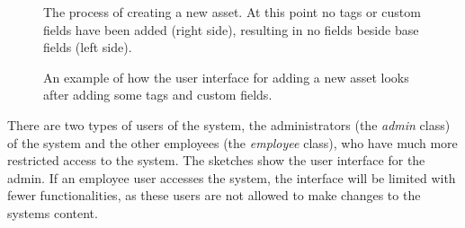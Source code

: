 \begin{figure}[H]
    \centering
    \caption{The process of creating a new asset. At this point no tags or custom fields have been added (right side), resulting in no fields beside base fields (left side).}
    \label{fig:add_asset_no_tags}
\end{figure}

\begin{figure}[H]
    \centering
    \caption{An example of how the user interface for adding a new asset looks after adding some tags and custom fields.}
    \label{fig:add_asset_with_tags}
\end{figure}

There are two types of users of the system, the administrators (the \textit{admin} class) of the system and the other employees (the \textit{employee} class), who have much more restricted access to the system. The sketches show the user interface for the admin. If an employee user accesses the system, the interface will be limited with fewer functionalities, as these users are not allowed to make changes to the systems content.